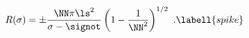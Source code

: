 \begin{equation}
R(\sigma)=\pm {\NN\pi\ls^2\over\sigma-\signot}\left(1-{1\over \NN^2}\right)^{1/2}\ .
\labell{spike}
\end{equation}

